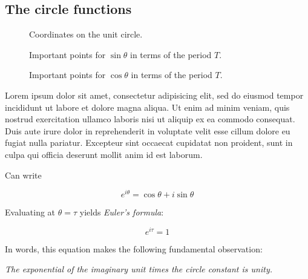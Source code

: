 \documentclass{article}
\begin{document}
  \subsection{The circle functions} %
  \label{sec:the_circle_functions}


\begin{figure}
\begin{center}
\end{center}
\caption{Coordinates on the unit circle.\label{fig:sine-with-tau}}
\end{figure}


\begin{figure}
\begin{center}
\end{center}
\caption{Important points for $\sin\theta$ in terms of the period $T$.\label{fig:sine-with-tau}}
\end{figure}

\begin{figure}
\begin{center}
\end{center}
\caption{Important points for $\cos\theta$ in terms of the period $T$.\label{fig:cosine-with-tau}}
\end{figure}


Lorem ipsum dolor sit amet, consectetur adipisicing elit, sed do eiusmod tempor incididunt ut labore et dolore magna aliqua. Ut enim ad minim veniam, quis nostrud exercitation ullamco laboris nisi ut aliquip ex ea commodo consequat. Duis aute irure dolor in reprehenderit in voluptate velit esse cillum dolore eu fugiat nulla pariatur. Excepteur sint occaecat cupidatat non proident, sunt in culpa qui officia deserunt mollit anim id est laborum.
  


Can write

\[ e^{i\theta} = \cos\theta + i\sin\theta \]

Evaluating at $\theta = \tau$ yields \emph{Euler's formula}:

\[ e^{i\tau} = 1 \]


In words, this equation makes the following fundamental observation: 

\begin{center}
\emph{The exponential of the imaginary unit times the circle constant is unity.} 
\end{center}
\end{document}
